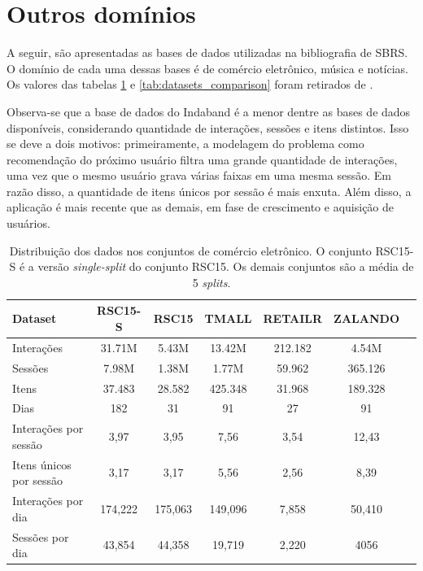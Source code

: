  \section{Outros domínios}
 A seguir, são apresentadas as bases de dados utilizadas na bibliografia de
  SBRS. O domínio de cada uma dessas bases é de comércio eletrônico, música e
  notícias. Os valores das tabelas \ref{tab:datasets} e
  \ref{tab:datasets_comparison} foram retirados de \citet{ludewig_2018}.

  Observa-se que a base de dados do Indaband é a menor dentre as bases
  de dados disponíveis, considerando quantidade de interações, sessões e itens
  distintos. Isso se deve a dois motivos: primeiramente, a modelagem do problema
  como recomendação do próximo usuário filtra uma grande quantidade de
  interações, uma vez que o mesmo usuário grava várias faixas em uma mesma
  sessão. Em razão disso, a quantidade de itens únicos por sessão é mais enxuta.
  Além disso, a aplicação é mais recente que as demais, em fase de crescimento e
  aquisição de usuários.

  \begin{table}[htbp]
    \centering
    \begin{tabular}{lcccccc}
        \toprule
        \textbf{Dataset} & \textbf{RSC15-S} & \textbf{RSC15} & \textbf{TMALL} & \textbf{RETAILR} & \textbf{ZALANDO} \\
        \midrule
        Interações & 31.71M & 5.43M & 13.42M & 212.182 & 4.54M \\
        Sessões & 7.98M & 1.38M & 1.77M & 59.962 & 365.126 \\
        Itens & 37.483 & 28.582 & 425.348 & 31.968 & 189.328 \\
        Dias & 182 & 31 & 91 & 27 & 91 \\
        \hline
        Interações por sessão & 3,97 & 3,95 & 7,56 & 3,54 & 12,43 \\ 
        Itens únicos por sessão & 3,17 & 3,17 & 5,56 & 2,56 & 8,39 \\ 
        Interações por dia & 174,222 & 175,063 & 149,096 & 7,858 & 50,410 \\
        Sessões por dia & 43,854 & 44,358 & 19,719 & 2,220 & 4056 \\ 
        \bottomrule
    \end{tabular}
    \caption{Distribuição dos dados nos conjuntos de comércio eletrônico. O
    conjunto RSC15-S é a versão \textit{single-split} do conjunto RSC15. Os demais
    conjuntos são a média de 5 \textit{splits}. }
    \label{tab:datasets}
  \end{table}
  

